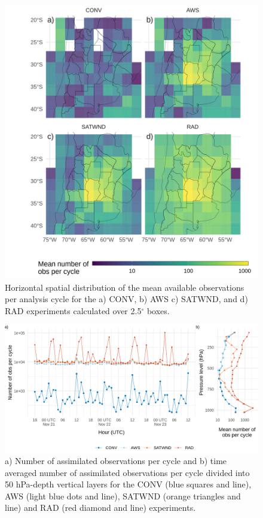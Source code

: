 \documentclass[final,5p,times,twocolumn,authoryear]{elsarticle} %
\begin{document}
\begin{figure}
\includegraphics[width=1\linewidth]{../figures/obs-horizontal-1} \caption{Horizontal spatial distribution of the mean available observations per analysis cycle for the a) CONV, b) AWS c) SATWND, and d) RAD experiments calculated over 2.5\(^{\circ}\) boxes.}\label{fig:obs-horizontal}
\end{figure}



\begin{figure}
\includegraphics{../figures/obs-cycle-1} \caption{a) Number of assimilated observations per cycle and b) time averaged number of assimilated observations per cycle divided into 50 hPa-depth vertical layers for the CONV (blue squares and line), AWS (light blue dots and line), SATWND (orange triangles and line) and RAD (red diamond and line) experiments.}\label{fig:obs-cycle}
\end{figure}
\end{document}

